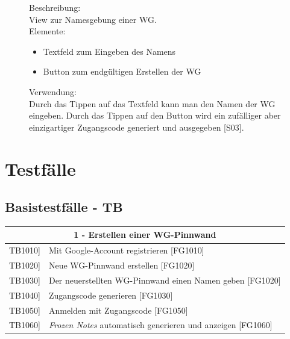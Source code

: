 \documentclass[a4paper]{scrreprt}
\begin{document}
\begin{figure}[h!]
\begin{minipage}[t]{0.55\linewidth}
    			Beschreibung: \\
    			View zur Namesgebung einer WG.
    			\\
    			Elemente:
    			\begin{itemize}
    				\renewcommand\labelitemi{--}
    				\item Textfeld zum Eingeben des Namens
    				\item Button zum endgültigen Erstellen der WG
    				
    			\end{itemize}
    			
    			Verwendung:\\
    			Durch das Tippen auf das Textfeld kann man
    			den Namen der WG eingeben.
    			Durch das Tippen auf den Button wird ein 
    			zufälliger aber einzigartiger Zugangscode 
    			generiert und ausgegeben {[}S03{]}.
    			
    			
    			
    		\end{minipage}
    	\end{figure}

    \chapter{Testfälle}
    
    	\section{Basistestfälle - TB}    
	    \begin{table}[h!]
	    	\centering
	    	\label{my-label}
	    	\begin{tabular}{p{2cm}p{12cm}}
	    		
	    		\multicolumn{2}{c}{\textbf{1 - Erstellen einer WG-Pinnwand}} \\ \hline
	    		\centering{[}TB1010{]} & Mit Google-Account registrieren {[}FG1010{]}\\
	    		\centering{[}TB1020{]}& Neue WG-Pinnwand erstellen {[}FG1020{]}                                \\
	    		\centering{[}TB1030{]} & Der neuerstellten WG-Pinnwand einen Namen geben {[}FG1020{]} \\ 
	    		\centering{[}TB1040{]}& Zugangscode generieren {[}FG1030{]}\\ 
	    		\centering{[}TB1050{]}& Anmelden mit Zugangscode {[}FG1050{]}\\ 
	    		\centering{[}TB1060{]}& \textit{Frozen Notes} automatisch generieren und anzeigen {[}FG1060{]}\\ 
	    		\hline
	    	\end{tabular}
	    \end{table}
	    
\end{document}
